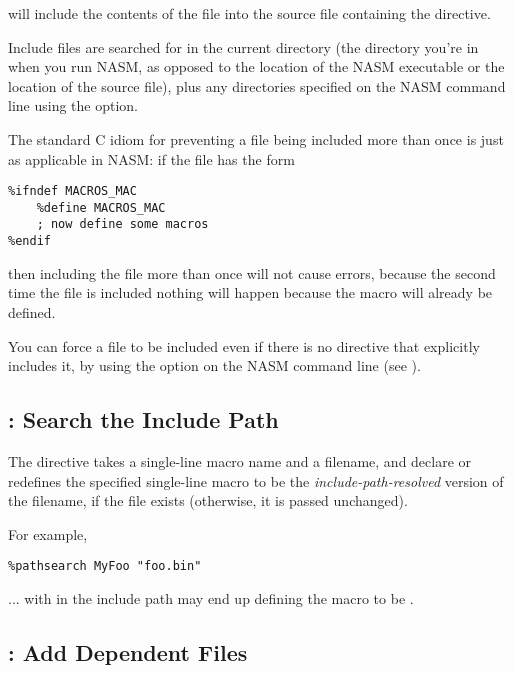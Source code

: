 will include the contents of the file  into the source
file containing the  directive.

Include files are searched for in the
current directory (the directory you're in when you run NASM, as
opposed to the location of the NASM executable or the location of
the source file), plus any directories specified on the NASM command
line using the  option.

The standard C idiom for preventing a file being included more than
once is just as applicable in NASM: if the file  has
the form

\begin{lstlisting}
%ifndef MACROS_MAC
    %define MACROS_MAC
    ; now define some macros
%endif
\end{lstlisting}

then including the file more than once will not cause errors,
because the second time the file is included nothing will happen
because the macro  will already be defined.

You can force a file to be included even if there is no 
directive that explicitly includes it, by using the  option
on the NASM command line (see ).

\subsection{: Search the Include Path}
\label{subsec:pathsearch}

The  directive takes a single-line macro name and a
filename, and declare or redefines the specified single-line macro to
be the \emph{include-path-resolved} version of the filename, if the file
exists (otherwise, it is passed unchanged).

For example,

\begin{lstlisting}
%pathsearch MyFoo "foo.bin"
\end{lstlisting}

... with  in the include path may end up defining the macro
 to be .

\subsection{: Add Dependent Files}
\label{subsec:depend}

